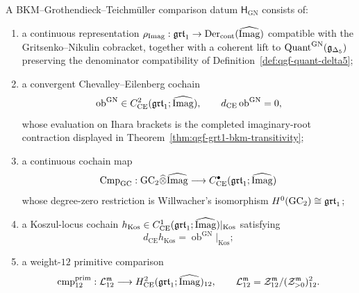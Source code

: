 \begin{definition}
\label{def:qgf-bkm-grt-comparison-datum}
A BKM--Grothendieck--Teichm\"uller comparison datum
$\mathsf H_{\mathrm{GN}}$ consists of:
\begin{enumerate}[label=\textup{(\roman*)}]
\item a continuous representation
$\rho_{\mathrm{Imag}}:\mathfrak{grt}_1\to\operatorname{Der}_{\mathrm{cont}}
(\widehat{\mathrm{Imag}})$ compatible with the Gritsenko--Nikulin cobracket,
together with a coherent lift to
$\mathrm{Quant}^{\mathrm{GN}}(\mathfrak g_{\Delta_5})$ preserving the
denominator compatibility of Definition~\ref{def:qgf-quant-delta5};
\item a convergent Chevalley--Eilenberg cochain
\[
 \operatorname{ob}^{\mathrm{GN}}
 \in C^2_{\mathrm{CE}}(\mathfrak{grt}_1;\widehat{\mathrm{Imag}}),
 \qquad d_{\mathrm{CE}}\operatorname{ob}^{\mathrm{GN}}=0,
\]
whose evaluation on Ihara brackets is the completed
imaginary-root contraction displayed in
Theorem~\ref{thm:qgf-grt1-bkm-transitivity};
\item a continuous cochain map
\[
 \operatorname{Cmp}_{\mathrm{GC}}:
 \mathrm{GC}_2\widehat\otimes\widehat{\mathrm{Imag}}
 \longrightarrow C^\bullet_{\mathrm{CE}}(\mathfrak{grt}_1;\widehat{\mathrm{Imag}})
\]
whose degree-zero restriction is Willwacher's isomorphism
$H^0(\mathrm{GC}_2)\cong\mathfrak{grt}_1$;
\item a Koszul-locus cochain
$h_{\mathrm{Kos}}\in
C^1_{\mathrm{CE}}(\mathfrak{grt}_1;\widehat{\mathrm{Imag}})|_{\mathrm{Kos}}$ satisfying
\[
 d_{\mathrm{CE}}h_{\mathrm{Kos}}
 =\operatorname{ob}^{\mathrm{GN}}|_{\mathrm{Kos}};
\]
\item a weight-$12$ primitive comparison
\[
 \operatorname{cmp}^{\mathrm{prim}}_{12}:
 \mathcal L^{\mathfrak m}_{12}\longrightarrow
 H^2_{\mathrm{CE}}(\mathfrak{grt}_1;\widehat{\mathrm{Imag}})_{12},
 \qquad
 \mathcal L^{\mathfrak m}_{12}
 =\mathcal Z^{\mathfrak m}_{12}/
 (\mathcal Z^{\mathfrak m}_{>0})^2_{12}.
\]
\end{enumerate}
\end{definition}

